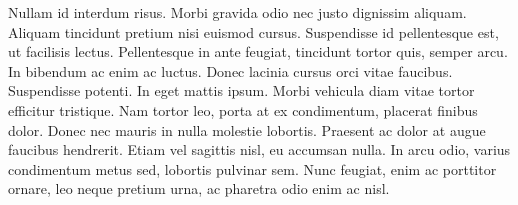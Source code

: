 Nullam id interdum risus. Morbi gravida odio nec justo dignissim
aliquam. Aliquam tincidunt pretium nisi euismod cursus. Suspendisse id
pellentesque est, ut facilisis lectus. Pellentesque in ante feugiat,
tincidunt tortor quis, semper arcu. In bibendum ac enim ac luctus. Donec
lacinia cursus orci vitae faucibus. Suspendisse potenti. In eget mattis
ipsum. Morbi vehicula diam vitae tortor efficitur tristique. Nam tortor
leo, porta at ex condimentum, placerat finibus dolor. Donec nec mauris
in nulla molestie lobortis. Praesent ac dolor at augue faucibus
hendrerit. Etiam vel sagittis nisl, eu accumsan nulla. In arcu odio,
varius condimentum metus sed, lobortis pulvinar sem. Nunc feugiat, enim
ac porttitor ornare, leo neque pretium urna, ac pharetra odio enim ac
nisl.
